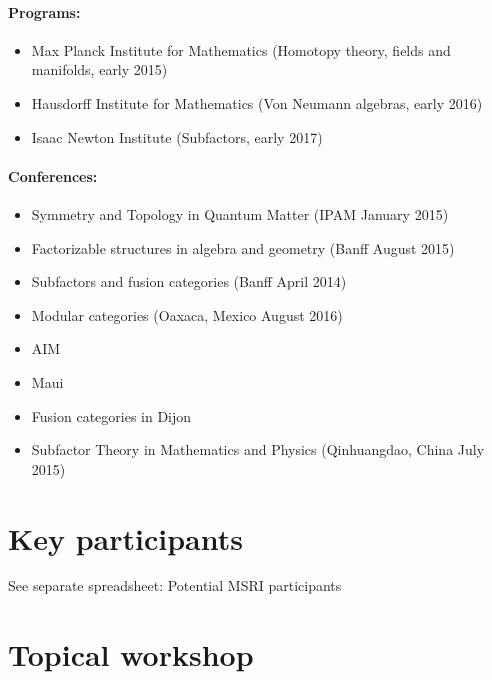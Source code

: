 \documentclass[11pt]{article}
\begin{document}
\paragraph{Programs:}
\begin{itemize}
\item Max Planck Institute for Mathematics (Homotopy theory, fields and manifolds, early 2015)
\item Hausdorff Institute for Mathematics (Von Neumann algebras, early 2016)
\item Isaac Newton Institute (Subfactors, early 2017)
\end{itemize}

\paragraph{Conferences:}
\begin{itemize}
\item Symmetry and Topology in Quantum Matter (IPAM January 2015)
\item Factorizable structures in algebra and geometry (Banff August 2015)
\item Subfactors and fusion categories (Banff April 2014)
\item Modular categories (Oaxaca, Mexico August 2016)
\item AIM
\item Maui
\item Fusion categories in Dijon
\item Subfactor Theory in Mathematics and Physics (Qinhuangdao, China July 2015)
\end{itemize}

\section{Key participants}
See separate spreadsheet: Potential MSRI participants

\section{Topical workshop}
\end{document}
